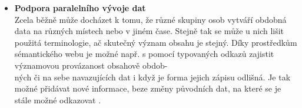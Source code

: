 \documentclass{projekt}
\begin{document}
\begin {itemize}
\hspace{0.65cm}Stejně jako u současné podoby webu, není nutné, aby odkaz zdroje byl neustále platný. Nedosažitelnost cílového zdroje tak není funkční překážkou, protože nástroje sémantického webu zpracovávají pouze dostupné informace, na základě kterých vytváří závěry. Stejně tak je možné zpracovávat jen vybrané úseky informací, ze kterých budou získávány neméně hodnotné výsledky. 

\item \textbf{Podpora paralelního vývoje dat}\\

\hspace{0.65cm}Zcela běžně může docházet k tomu, že různé skupiny osob vytváří obdobná data na různých místech nebo v jiném čase. Stejně tak se může u nich lišit použitá terminologie, ač skutečný význam obsahu je stejný. Díky prostředkům sémantického webu je možné např. s pomocí typovaných odkazů zajistit významovou provázanost obsahově obdob-\\ných či na sebe navazujících dat i když je forma jejich zápisu odlišná. Je tak možné přidávat nové informace, beze změny původních dat, na které se je stále možné odkazovat \cite{dva}.

\end{itemize}
\end{document}

